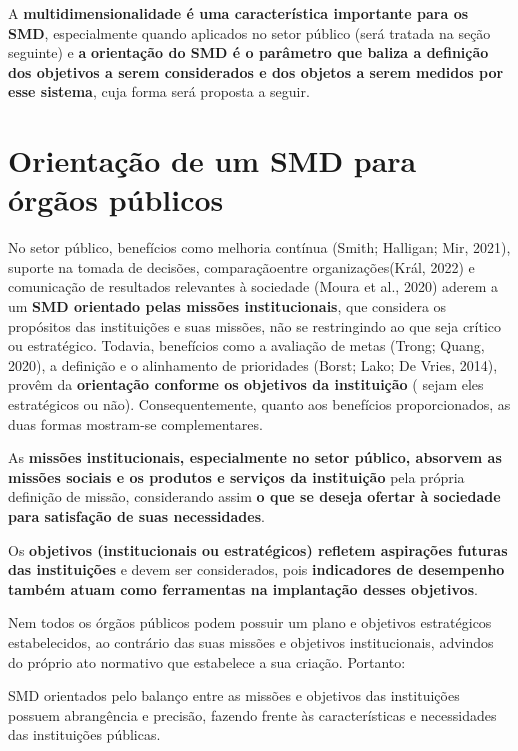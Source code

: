 \documentclass[
  letterpaper,
  DIV=11,
  numbers=noendperiod]{scrreprt}
\begin{document}
A \textbf{multidimensionalidade é uma característica importante para os
SMD}, especialmente quando aplicados no setor público (será tratada na
seção seguinte) e \textbf{a} \textbf{orientação do SMD é o parâmetro que
baliza a definição dos objetivos a serem considerados e dos objetos a
serem medidos por esse sistema}, cuja forma será proposta a seguir.

\hypertarget{orientauxe7uxe3o-de-um-smd-para-uxf3rguxe3os-puxfablicos}{%
\section{Orientação de um SMD para órgãos
públicos}\label{orientauxe7uxe3o-de-um-smd-para-uxf3rguxe3os-puxfablicos}}

No setor público, benefícios como melhoria contínua (Smith; Halligan;
Mir, 2021), suporte na tomada de decisões, comparaçãoentre
organizações(Král, 2022) e comunicação de resultados relevantes à
sociedade (Moura et al., 2020) aderem a um \textbf{SMD orientado pelas
missões institucionais}, que considera os propósitos das instituições e
suas missões, não se restringindo ao que seja crítico ou estratégico.
Todavia, benefícios como a avaliação de metas (Trong; Quang, 2020), a
definição e o alinhamento de prioridades (Borst; Lako; De Vries, 2014),
provêm da \textbf{orientação conforme os objetivos da instituição} (
sejam eles estratégicos ou não). Consequentemente, quanto aos benefícios
proporcionados, as duas formas mostram-se complementares.

As \textbf{missões institucionais, especialmente no setor público,
absorvem as missões sociais e os produtos e serviços da instituição}
pela própria definição de missão, considerando assim \textbf{o que se
deseja ofertar à sociedade para satisfação de suas necessidades}.

Os \textbf{objetivos (institucionais ou estratégicos) refletem
aspirações futuras das instituições} e devem ser considerados, pois
\textbf{indicadores de desempenho também atuam como ferramentas na
implantação desses objetivos}.

Nem todos os órgãos públicos podem possuir um plano e objetivos
estratégicos estabelecidos, ao contrário das suas missões e objetivos
institucionais, advindos do próprio ato normativo que estabelece a sua
criação. Portanto:

\begin{tcolorbox}[enhanced jigsaw, title=\textcolor{quarto-callout-warning-color}{\faExclamationTriangle}\hspace{0.5em}{Importante}, bottomrule=.15mm, arc=.35mm, bottomtitle=1mm, toprule=.15mm, coltitle=black, opacityback=0, colback=white, rightrule=.15mm, breakable, toptitle=1mm, leftrule=.75mm, titlerule=0mm, opacitybacktitle=0.6, colbacktitle=quarto-callout-warning-color!10!white, left=2mm, colframe=quarto-callout-warning-color-frame]

SMD orientados pelo balanço entre as missões e objetivos das
instituições possuem abrangência e precisão, fazendo frente às
características e necessidades das instituições públicas.

\end{tcolorbox}
\end{document}
